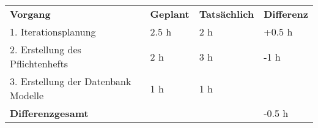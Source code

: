 \begin{tabu}{llll}
\rowfont{\bfseries\leavevmode\color{headingfont}}\textbf{Vorgang} & \textbf{Geplant} & \textbf{Tatsächlich} & \textbf{Differenz} \\
1. Iterationsplanung & 2.5 h & 2 h & +0.5 h\\ 
2. Erstellung des Pflichtenhefts & 2 h & 3 h & -1 h \\
3. Erstellung der Datenbank Modelle & 1 h & 1 h & \\
\hline
\hline
{}\textbf{Differenzgesamt} & & & -0.5 h \\
\end{tabu}
